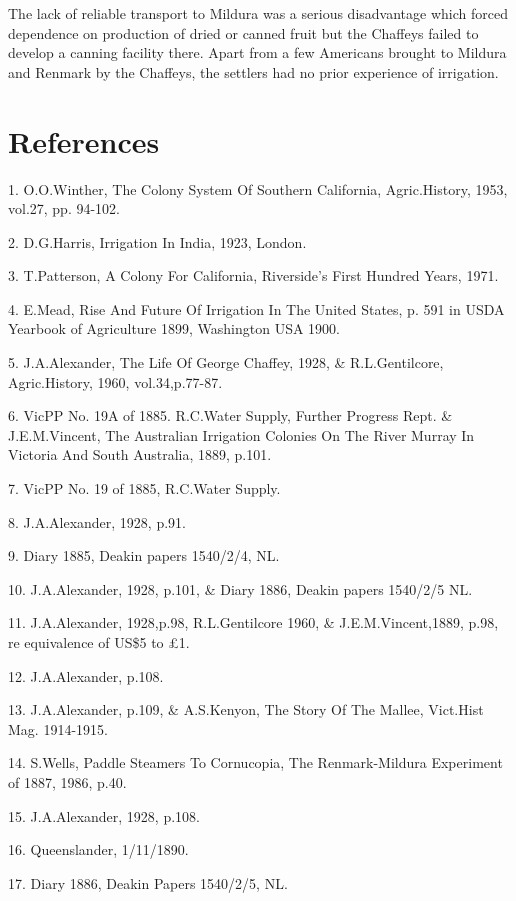 The lack of reliable transport to Mildura was a serious disadvantage
which forced dependence on production of dried or canned fruit but the
Chaffeys failed to develop a canning facility there.  Apart from a few
Americans brought to Mildura and Renmark by the Chaffeys, the settlers
had no prior experience of irrigation.

\section{References}

1. O.O.Winther, The Colony System Of Southern California, Agric.History, 
     1953, vol.27, pp. 94-102.

2. D.G.Harris, Irrigation In India, 1923, London.

3. T.Patterson, A Colony For California, Riverside's First Hundred Years, 
     1971.

4. E.Mead, Rise And Future Of Irrigation In The United States, p. 591 in 
     USDA Yearbook of Agriculture 1899, Washington USA 1900.

5. J.A.Alexander, The Life Of George Chaffey, 1928, \& R.L.Gentilcore, 
    Agric.History, 1960, vol.34,p.77-87.

6. VicPP No. 19A of 1885. R.C.Water Supply, Further Progress Rept. \&
     J.E.M.Vincent, The Australian Irrigation Colonies On The River Murray In 
     Victoria And South Australia, 1889, p.101.

7. VicPP No. 19 of 1885, R.C.Water Supply.

8. J.A.Alexander, 1928, p.91.

9. Diary 1885, Deakin papers 1540/2/4, NL.

10. J.A.Alexander, 1928, p.101, \& Diary 1886, Deakin papers 1540/2/5 NL.

11. J.A.Alexander, 1928,p.98, R.L.Gentilcore 1960, \&
      J.E.M.Vincent,1889, p.98, re equivalence of US\$5 to \pounds1.

12. J.A.Alexander, p.108.

13. J.A.Alexander, p.109, \& A.S.Kenyon, The Story Of The Mallee, Vict.Hist 
     Mag. 1914-1915.

14. S.Wells, Paddle Steamers To Cornucopia, The Renmark-Mildura 
       Experiment of 1887, 1986, p.40.

15. J.A.Alexander, 1928, p.108.

16. Queenslander, 1/11/1890.

17. Diary 1886, Deakin Papers 1540/2/5, NL.


